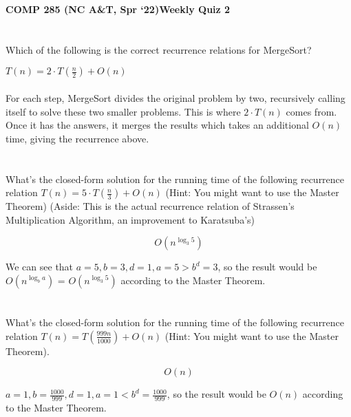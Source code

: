 \documentclass [12pt]{article}
\begin{document}
 

{\LARGE \textbf {COMP 285 (NC A\&T, Spr `22)}\hfill \textbf {Weekly Quiz 2} } 

\section{} Which of the following is the correct recurrence relations for MergeSort?

\begin{Solution}
$T(n) = 2 \cdot T\left(\frac{n}{2}\right) + O(n)$
\paragraph{} 
 For each step, MergeSort divides the original problem by two, recursively calling itself to solve these two smaller problems. This is where $2 \cdot T(n)$ comes from. Once it has the answers, it merges the results which takes an additional $O(n)$ time, giving the recurrence above.
\end{Solution}


\section{} What's the closed-form solution for the running time of the following recurrence relation $T(n) = 5 \cdot T\left(\frac{n}{3}\right) + O(n)$ (Hint: You might want to use the Master Theorem) (Aside: This is the actual recurrence relation of Strassen's Multiplication Algorithm, an improvement to Karatsuba's)

\begin{Solution}
$$
O(n^{\log_3 5})
$$

We can see that $a=5, b=3, d=1, a=5 > b^d=3$, so the result would be  $O(n^{\log_b a})$ = $O(n^{\log_3 5})$ according to the Master Theorem.
\end{Solution}


\section{} What's the closed-form solution for the running time of the following recurrence relation $T(n) = T\left(\frac{999n}{1000}\right) + O(n)$ (Hint: You might want to use the Master Theorem).

\begin{Solution}
$$O(n)$$

$a=1, b=\frac{1000}{999}, d=1, a=1 < b^d=\frac{1000}{999}$, so the result would be $O(n)$ according to the Master Theorem.
\end{Solution}
\end{document}
